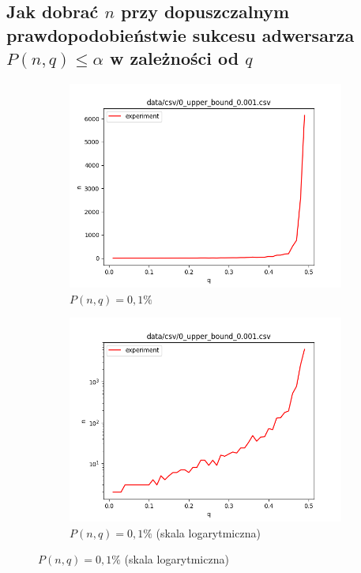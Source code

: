 \documentclass[a4paper,11pt]{article}
\theoremstyle{mytheor}
\begin{document}
\subsection*{Jak dobrać $n$ przy dopuszczalnym prawdopodobieństwie sukcesu adwersarza $P(n, q) \leq \alpha$ w zależności od $q$}
\begin{figure}[H]
    \begin{subfigure}{0.5\textwidth}
        \includegraphics[width=1.0\linewidth]{0_upper_bound_0.001.png}
        \caption{$P(n, q) = 0,1\%$}
        \label{fig:subim1}
    \end{subfigure}
    \begin{subfigure}{0.5\textwidth}
        \includegraphics[width=1.0\linewidth]{0_upper_bound_log_0.001.png}
        \caption{$P(n, q) = 0,1\%$ (skala logarytmiczna)}
        \label{fig:subim1}
    \end{subfigure}


\end{figure}
\end{document}
